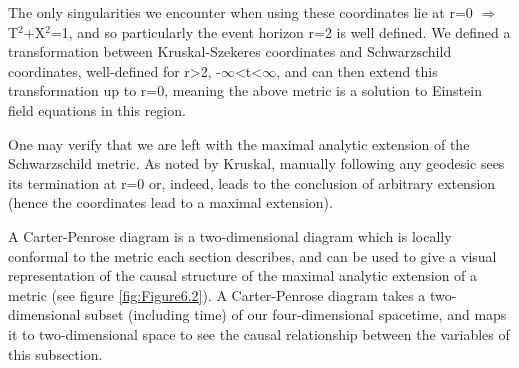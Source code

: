 \documentclass[oneside,openright,frontopenright, singlespacing]{dmathesis}
\begin{document}
	The only singularities we encounter when using these coordinates lie at r=0 $\Rightarrow$ T$^2$+X$^2$=1, and so particularly the event horizon r=2 is well defined. We defined a transformation between Kruskal-Szekeres coordinates and Schwarzschild coordinates, well-defined for r>2, -$\infty$<t<$\infty$, and can then extend this transformation up to r=0, meaning the above metric is a solution to Einstein field equations in this region. 

\vspace{1em}
	One may verify that we are left with the maximal analytic extension of the Schwarzschild metric. As noted by Kruskal, manually following any geodesic sees its termination at r=0 or, indeed, leads to the conclusion of arbitrary extension (hence the coordinates lead to a maximal extension).

\vspace{1em}
	A Carter-Penrose diagram is a two-dimensional diagram which is locally conformal to the metric each section describes, and can be used to give a visual representation of the causal structure of the maximal analytic extension of a metric (see figure \ref{fig:Figure6.2}). A Carter-Penrose diagram takes a two-dimensional subset (including time) of our four-dimensional spacetime, and maps it to two-dimensional space to see the causal relationship between the variables of this subsection.
\end{document}
